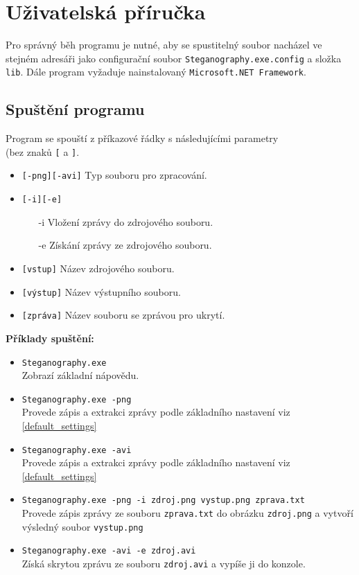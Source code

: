 \documentclass[12pt]{article}
\begin{document}
\pagebreak
\section{Uživatelská příručka}
Pro správný běh programu je nutné, aby se spustitelný soubor nacházel ve stejném adresáři jako configurační soubor \texttt{Steganography.exe.config} a složka \texttt{lib}. Dále program vyžaduje nainstalovaný \texttt{Microsoft.NET Framework}.

\subsection{Spuštění programu}
Program se spouští z příkazové řádky s následujícími parametry \\(bez znaků \texttt{[} a \texttt{]}.

\begin{itemize}
\setlength\itemsep{1px}
\item{\texttt{[-png][-avi]}} Typ souboru pro zpracování.
\item{\texttt{[-i][-e]}}
\begin{itemize}
	\setlength\itemsep{1px}
	\item[-i] Vložení zprávy do zdrojového souboru.
	\item[-e] Získání zprávy ze zdrojového souboru.
\end{itemize}
\item{\texttt{[vstup]}} Název zdrojového souboru.
\item{\texttt{[výstup]}} Název výstupního souboru.
\item{\texttt{[zpráva]}} Název souboru se zprávou pro ukrytí.
\end{itemize}


\vspace{3mm}
\textbf{Příklady spuštění:}
\begin{itemize}
\setlength\itemsep{1px}

\item \texttt{Steganography.exe}\\ 
Zobrazí základní nápovědu.
\item \texttt{Steganography.exe -png}\\ 
Provede zápis a extrakci zprávy podle základního nastavení viz \ref{default_settings}
\item \texttt{Steganography.exe -avi}\\ 
Provede zápis a extrakci zprávy podle základního nastavení viz \ref{default_settings}
\item \texttt{Steganography.exe -png -i zdroj.png vystup.png zprava.txt}\\ 
Provede zápis zprávy ze souboru \texttt{zprava.txt} do obrázku \texttt{zdroj.png} a vytvoří výsledný soubor \texttt{vystup.png}
\item \texttt{Steganography.exe -avi -e zdroj.avi}\\ 
Získá skrytou zprávu ze souboru \texttt{zdroj.avi} a vypíše ji do konzole.
\end{itemize}
\end{document}
